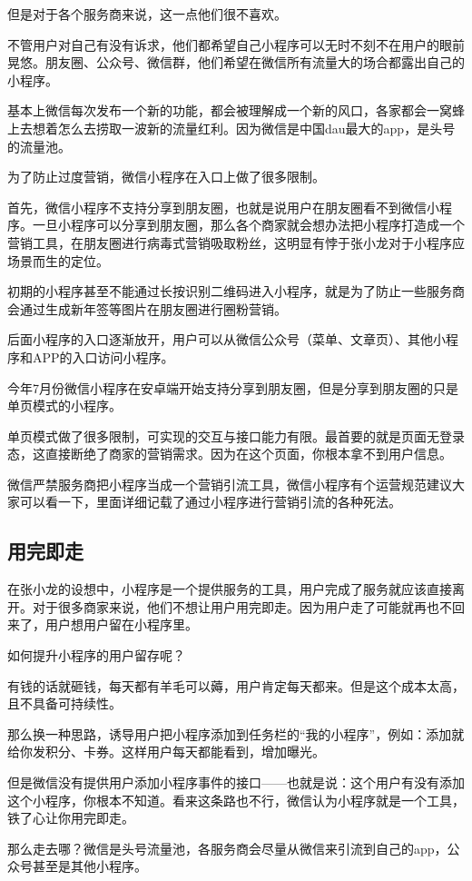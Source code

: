 \documentclass[12pt]{article}
\begin{document}
但是对于各个服务商来说，这一点他们很不喜欢。

不管用户对自己有没有诉求，他们都希望自己小程序可以无时不刻不在用户的眼前晃悠。朋友圈、公众号、微信群，他们希望在微信所有流量大的场合都露出自己的小程序。

基本上微信每次发布一个新的功能，都会被理解成一个新的风口，各家都会一窝蜂上去想着怎么去捞取一波新的流量红利。因为微信是中国dau最大的app，是头号的流量池。

为了防止过度营销，微信小程序在入口上做了很多限制。

首先，微信小程序不支持分享到朋友圈，也就是说用户在朋友圈看不到微信小程序。一旦小程序可以分享到朋友圈，那么各个商家就会想办法把小程序打造成一个营销工具，在朋友圈进行病毒式营销吸取粉丝，这明显有悖于张小龙对于小程序应场景而生的定位。

初期的小程序甚至不能通过长按识别二维码进入小程序，就是为了防止一些服务商会通过生成新年签等图片在朋友圈进行圈粉营销。

后面小程序的入口逐渐放开，用户可以从微信公众号（菜单、文章页）、其他小程序和APP的入口访问小程序。

今年7月份微信小程序在安卓端开始支持分享到朋友圈，但是分享到朋友圈的只是单页模式的小程序。

单页模式做了很多限制，可实现的交互与接口能力有限。最首要的就是页面无登录态，这直接断绝了商家的营销需求。因为在这个页面，你根本拿不到用户信息。

微信严禁服务商把小程序当成一个营销引流工具，微信小程序有个运营规范建议大家可以看一下，里面详细记载了通过小程序进行营销引流的各种死法。

\subsection{用完即走}
在张小龙的设想中，小程序是一个提供服务的工具，用户完成了服务就应该直接离开。对于很多商家来说，他们不想让用户用完即走。因为用户走了可能就再也不回来了，用户想用户留在小程序里。

如何提升小程序的用户留存呢？

有钱的话就砸钱，每天都有羊毛可以薅，用户肯定每天都来。但是这个成本太高，且不具备可持续性。

那么换一种思路，诱导用户把小程序添加到任务栏的“我的小程序”，例如：添加就给你发积分、卡券。这样用户每天都能看到，增加曝光。

但是微信没有提供用户添加小程序事件的接口——也就是说：这个用户有没有添加这个小程序，你根本不知道。看来这条路也不行，微信认为小程序就是一个工具，铁了心让你用完即走。

那么走去哪？微信是头号流量池，各服务商会尽量从微信来引流到自己的app，公众号甚至是其他小程序。
\end{document}
